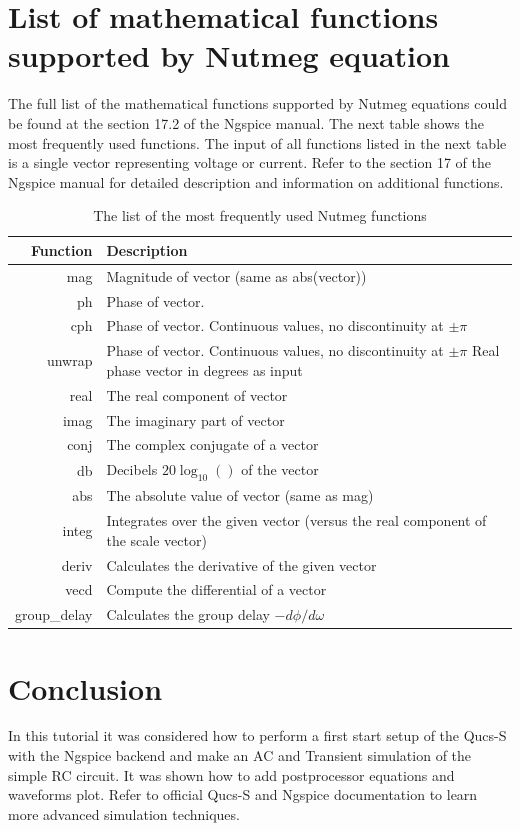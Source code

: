 \documentclass[a4paper,12pt]{article}
\begin{document}
\section{List of mathematical functions supported by Nutmeg equation}

The full list of the mathematical functions supported by Nutmeg equations could be found at the section 17.2 of the Ngspice manual. The next table shows the most frequently used functions. The input of all functions listed in the next table is a single vector representing voltage or current. Refer to the section 17 of the Ngspice manual for detailed description and information on additional functions.

\begin{table}[!ht]
\caption{The list of the most frequently used Nutmeg functions}
 \begin{tabularx}{\textwidth}{|r|X|}
\hline
Function & Description \\
\hline
mag & Magnitude of vector (same as abs(vector)) \\
ph & Phase of vector. \\
cph & Phase of vector. Continuous values, no discontinuity at $\pm\pi$ \\
unwrap & Phase of vector. Continuous values, no discontinuity at $\pm\pi$ Real phase vector in degrees as input \\
real & The real component of vector \\
imag & The imaginary part of vector\\
conj & The complex conjugate of a vector \\
db & Decibels $20 \log_{10}()$ of the vector \\
abs & The absolute value of vector (same as mag) \\
integ & Integrates over the given vector (versus the real component of the scale vector) \\ 
deriv & Calculates the derivative of the given vector \\
vecd & Compute the differential of a vector \\
group\_delay & Calculates the group delay $-d\phi/d\omega$ \\
\hline
\end{tabularx}
\end{table}




\section{Conclusion}

In this tutorial it was considered how to perform a first start setup of the Qucs-S with the Ngspice backend and make an AC and Transient simulation of the simple RC circuit. It was shown how to add postprocessor equations and waveforms plot. Refer to official Qucs-S and Ngspice documentation to learn more advanced simulation techniques. 
\end{document}
